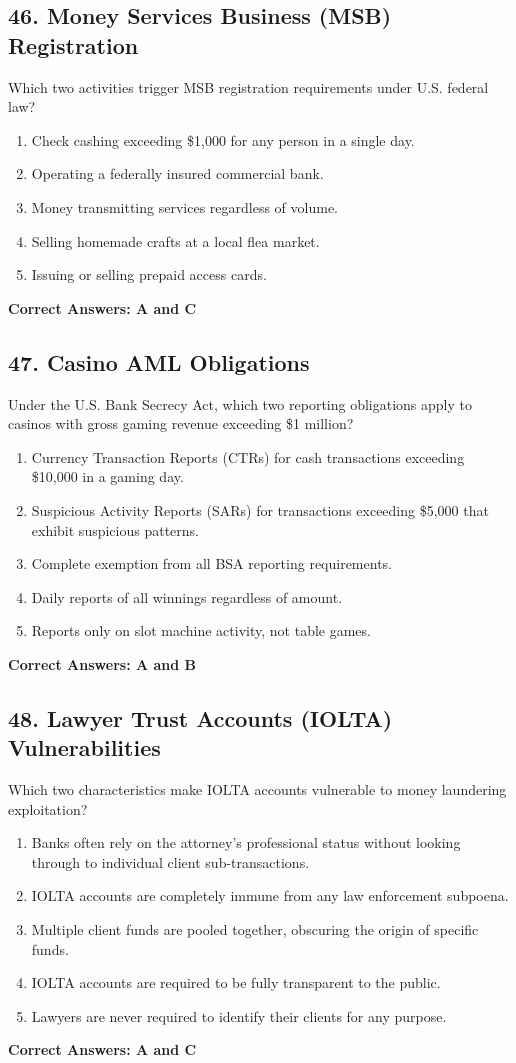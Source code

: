 \documentclass[11pt,a4paper]{article}
\begin{document}
	\subsection{46. Money Services Business (MSB) Registration}
	Which two activities trigger MSB registration requirements under U.S. federal law?
	\begin{enumerate}[label=\Alph*.]
		\item Check cashing exceeding \$1,000 for any person in a single day.
		\item Operating a federally insured commercial bank.
		\item Money transmitting services regardless of volume.
		\item Selling homemade crafts at a local flea market.
		\item Issuing or selling prepaid access cards.
	\end{enumerate}
	\textbf{Correct Answers: A and C}
	
	\subsection{47. Casino AML Obligations}
	Under the U.S. Bank Secrecy Act, which two reporting obligations apply to casinos with gross gaming revenue exceeding \$1 million?
	\begin{enumerate}[label=\Alph*.]
		\item Currency Transaction Reports (CTRs) for cash transactions exceeding \$10,000 in a gaming day.
		\item Suspicious Activity Reports (SARs) for transactions exceeding \$5,000 that exhibit suspicious patterns.
		\item Complete exemption from all BSA reporting requirements.
		\item Daily reports of all winnings regardless of amount.
		\item Reports only on slot machine activity, not table games.
	\end{enumerate}
	\textbf{Correct Answers: A and B}
	
	\subsection{48. Lawyer Trust Accounts (IOLTA) Vulnerabilities}
	Which two characteristics make IOLTA accounts vulnerable to money laundering exploitation?
	\begin{enumerate}[label=\Alph*.]
		\item Banks often rely on the attorney's professional status without looking through to individual client sub-transactions.
		\item IOLTA accounts are completely immune from any law enforcement subpoena.
		\item Multiple client funds are pooled together, obscuring the origin of specific funds.
		\item IOLTA accounts are required to be fully transparent to the public.
		\item Lawyers are never required to identify their clients for any purpose.
	\end{enumerate}
	\textbf{Correct Answers: A and C}
	
\end{document}
